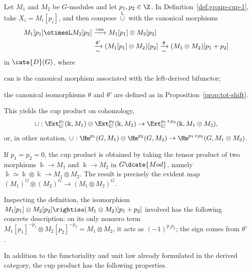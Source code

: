 \begin{definition}\label{def:group-cup-2}
	Let $M_1$ and $M_2$ be $G$-modules and let $p_1,p_2\in\Z$. In
	Definition~\ref{def:group-cup-1}, take $X_i=M_i[p_i]$, and then compose
	$\overset{\mathrm{L}}{\cup}$ with the canonical morphisms
	\begin{align*}
		M_1[p_1] \otimesL M_2[p_2] & \xrightarrow{\text{can}} M_1[p_1] \otimes M_2[p_2] \\
		& \xrightarrow[\sim]{\theta'} (M_1[p_1] \otimes M_2) [p_2] \xrightarrow[\sim]{\theta} (M_1 \otimes M_2)[p_1 + p_2]
	\end{align*}
	in $\cate{D}(G)$, where
	\begin{compactitem}
		\item $\mathrm{can}$ is the canonical morphism associated with the
		left-derived bifunctor;
		\item the canonical isomorphisms $\theta$ and $\theta'$ are defined as
		in Proposition~\ref{prop:tot-shift}.
	\end{compactitem}
	This yields the cup product on cohomology,
	\[ \cup: \Ext^{p_1}_G(\Bbbk, M_1) \otimes \Ext^{p_2}_G(\Bbbk, M_2) \to \Ext^{p_1 + p_2}_G(\Bbbk, M_1 \otimes M_2), \]
	or, in other notation,
	$\cup:\Hm^{p_1}(G,M_1)\otimes\Hm^{p_2}(G,M_2)
	\to\Hm^{p_1+p_2}(G,M_1\otimes M_2)$.
\end{definition}

If $p_1=p_2=0$, the cup product is obtained by taking the tensor product of
two morphisms $\Bbbk\to M_1$ and $\Bbbk\to M_2$ in $G\dcate{Mod}$, namely
$\Bbbk\simeq\Bbbk\otimes\Bbbk\to M_1\otimes M_2$. The result is precisely
the evident map $(M_1)^G\otimes(M_2)^G\to(M_1\otimes M_2)^G$.

Inspecting the definition, the isomorphism
$M_1[p_1]\otimes M_2[p_2]\rightiso(M_1\otimes M_2)[p_1+p_2]$ involved has
the following concrete description: on its only nonzero term
$M_1[p_1]^{-p_1}\otimes M_2[p_2]^{-p_2}=M_1\otimes M_2$, it acts as
$(-1)^{p_1p_2}$; the sign comes from $\theta'$.

In addition to the functoriality and unit law already formulated in the
derived category, the cup product has the following properties.

